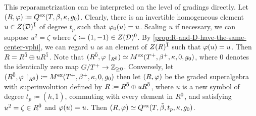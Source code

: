 This reparametrization can be interpreted on the level of gradings directly. 
Let $(R, \varphi) \coloneqq Q^{\mathrm{ex}} (T, \beta, \kappa, g_0)$. 
Clearly, there is an invertible homogeneous element $u \in Z(\mathcal{D})^{\bar1}$ of degree $t_p$ such that $\varphi_0(u) = u$. 
Scaling $u$ if necessary, we can suppose $u^2 = \zeta$ where $\zeta \coloneqq (1, -1) \in Z(\mathcal{D})^{\bar0}$. 
By \cref{prop:R-and-D-have-the-same-center-vphi}, we can regard $u$ as an element of $Z(R)^{\bar1}$ such that $\varphi(u) = u$. 
Then $R = R^{\bar0} \oplus u R^{\bar1}$. 
Note that ${(R^{\bar0}, \varphi\restriction_{R^{\bar0}})} \simeq M^{\mathrm{ex}} (T^+, \beta^+, \kappa, 0, g_0)$, where $0$ denotes the identically zero map $G/T^+ \to \mathbb{Z}_{\geq 0}$. 
Conversely, let $(R^{\bar0}, \varphi\restriction_{R^{\bar0}}) \coloneqq M^{\mathrm{ex}} (T^+, \beta^+, \kappa, 0, g_0)$ then let $(R, \varphi)$ be the graded superalgebra with superinvolution defined by $R \coloneqq R^{\bar0} \oplus u R^{\bar0}$, where $u$ is a new symbol of degree $t_p \coloneqq (h, \bar 1)$, commuting with every element in $R^{\bar0}$, and satisfying $u^2 = \zeta \in R^{\bar0}$ and $\varphi(u) = u$. 
Then $(R, \varphi) \simeq Q^{\mathrm{ex}} (T, \tilde\beta, t_p, \kappa, g_0)$. 